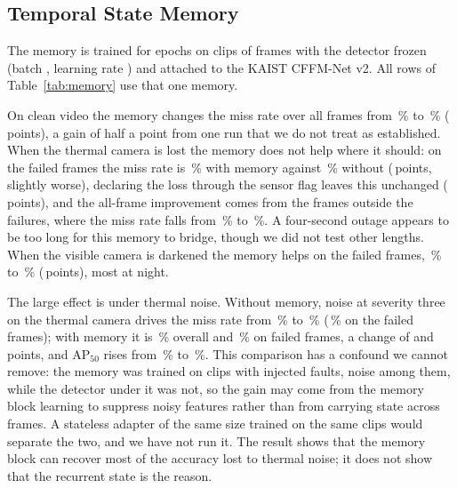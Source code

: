 \subsection{Temporal State Memory}
\label{sec:kaistmemory}
The memory is trained for \cfgMemEpochs{} epochs on clips of \cfgClipLen{} frames with the detector frozen (batch \cfgMemBatch{}, learning rate \cfgMemLr{}) and attached to the KAIST CFFM-Net v2. All rows of Table~\ref{tab:memory} use that one memory.

On clean video the memory changes the miss rate over all frames from \memCleanImageAllMr{}\,\% to \memCleanMemoryAllMr{}\,\% (\memChangeCleanAllMr{}\,points), a gain of half a point from one run that we do not treat as established. When the thermal camera is lost the memory does not help where it should: on the failed frames the miss rate is \memThermalLostMemoryFailedMr{}\,\% with memory against \memThermalLostImageFailedMr{}\,\% without (\memChangeThermalLostFailedMr{}\,points, slightly worse), declaring the loss through the sensor flag leaves this unchanged (\memChangeThermalLostFlaggedFailedMr{}\,points), and the all-frame improvement comes from the frames outside the failures, where the miss rate falls from \memThermalLostImageHealthyMr{}\,\% to \memThermalLostMemoryHealthyMr{}\,\%. A four-second outage appears to be too long for this memory to bridge, though we did not test other lengths. When the visible camera is darkened the memory helps on the failed frames, \memVisibleDarkImageFailedMr{}\,\% to \memVisibleDarkMemoryFailedMr{}\,\% (\memChangeVisibleDarkFailedMr{}\,points), most at night.

The large effect is under thermal noise. Without memory, noise at severity three on the thermal camera drives the miss rate from \memCleanImageAllMr{}\,\% to \memThermalNoiseImageAllMr{}\,\% (\memThermalNoiseImageFailedMr{}\,\% on the failed frames); with memory it is \memThermalNoiseMemoryAllMr{}\,\% overall and \memThermalNoiseMemoryFailedMr{}\,\% on failed frames, a change of \memChangeThermalNoiseAllMr{} and \memChangeThermalNoiseFailedMr{}\,points, and AP$_{50}$ rises from \memThermalNoiseImageAllApFifty{}\,\% to \memThermalNoiseMemoryAllApFifty{}\,\%. This comparison has a confound we cannot remove: the memory was trained on clips with injected faults, noise among them, while the detector under it was not, so the gain may come from the memory block learning to suppress noisy features rather than from carrying state across frames. A stateless adapter of the same size trained on the same clips would separate the two, and we have not run it. The result shows that the memory block can recover most of the accuracy lost to thermal noise; it does not show that the recurrent state is the reason.

